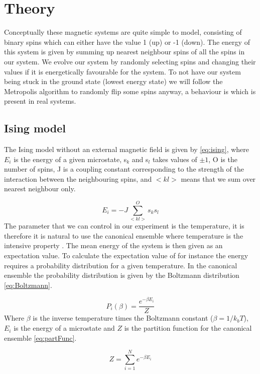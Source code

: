 \section{Theory}

Conceptually these magnetic systems are quite simple to model,
consisting of binary spins which can either have the value 1 (up) or -1 (down).
The energy of this system is given by summing up nearest neighbour spins of all
the spins in our system. We evolve our system by randomly selecting spins and
changing their values if it is energetically favourable for the system. To not
have our system being stuck in the ground state (lowest energy state) we will
follow the Metropolis algorithm to randomly flip some spins anyway, a
behaviour is which is present in real systems.


\subsection{Ising model}
The Ising model without an external magnetic field is given by
\cref{eq:ising}, where $E_i$ is the energy of a given microstate, s$_k$ and s$_l$ takes values of $\pm 1$, O is the
number of spins, J is a coupling constant corresponding to the strength of the
interaction between the neighbouring spins, and $<kl>$ means that we sum over
nearest neighbour only.

\begin{equation}\label{eq:ising}
  E_i = -J\sum_{<kl>}^{O} s_k s_l
\end{equation}
The parameter that we can control in our experiment is the temperature, it
is therefore it is natural to
use the canonical ensemble where temperature is the intensive property
\parencite{lectures}. The
mean energy of the system is then given as an expectation value. To calculate
the expectation value of for instance the energy requires a probability
distribution for a given temperature. In the canonical ensemble the probability
distribution is given by the Boltzmann distribution \cref{eq:Boltzmann}.

\begin{equation}\label{eq:Boltzmann}
  P_i(\beta) = \frac{e^{-\beta E_i}}{Z}
\end{equation}
Where $\beta$ is the inverse temperature times the Boltzmann constant
($\beta = 1/k_bT $),  $E_i$ is the energy of a microstate and $Z$
 is the partition function for the canonical ensemble \cref{eq:partFunc}.

\begin{equation}\label{eq:partFunc}
  Z = \sum_{i=1}^{N} e^{-\beta E_i}
\end{equation}

